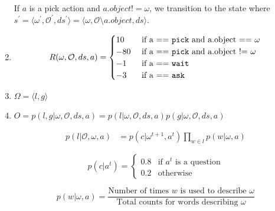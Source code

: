 \documentclass{article}
\begin{document}
\begin{enumerate}
		If $a$ is a pick action and $a.object != \omega$, we transition to the state where $s^\prime = \langle \omega^\prime, \mathcal{O}^\prime, ds^\prime \rangle = \langle \omega, \mathcal{O} \setminus a.object, ds\rangle$. 

	\item 
		\begin{equation*}
			R(\omega, \mathcal{O}, ds, a) = 
			\begin{cases}
				10 & \text{ if a == \texttt{pick} and a.object == $\omega$} \\
				-80 & \text{ if a == \texttt{pick} and a.object != $\omega$} \\
				-1 & \text{ if a == \texttt{wait}} \\
				-3 & \text{ if a == \texttt{ask}}
			\end{cases}
		\end{equation*}
	\item $\Omega = \langle l, g \rangle$
	\item $O = p(l, g | \omega, \mathcal{O}, ds, a) = p(l | \omega, \mathcal{O}, ds, a)  p(g | \omega, \mathcal{O}, ds, a)    $

\begin{align}
	p(l|\mathcal{O},\omega,a) &= 
p(c|\omega^{t+1}, a^t)\prod_{w \in l} p(w|\omega,a)
\end{align}


\begin{equation}
	p(c|a^t) = \begin{cases}
		0.8 & \text{if $a^t$ is a question} \\
		0.2 & \text{otherwise}
	\end{cases}
\end{equation}

$$p(w|\omega, a) = \frac{\text{Number of times $w$ is used to describe $\omega$}}{ \text{Total counts for words describing $\omega$}}$$





\end{enumerate}
\end{document}
